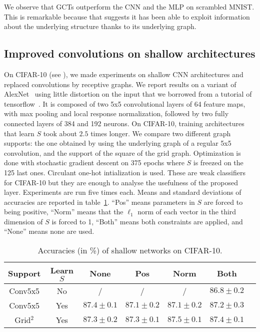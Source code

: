 We observe that GCTs outperform the CNN and the MLP on scrambled MNIST. This is remarkable because that suggests it has been able to exploit information about the underlying structure thanks to its underlying graph.

\subsection{Improved convolutions on shallow architectures}

On CIFAR-10 (see ), we made experiments on shallow CNN architectures and replaced convolutions by receptive graphs. We report results on a variant of AlexNet~\citep{krizhevsky2012imagenet} using little distortion on the input that we borrowed from a tutorial of tensorflow~\citep{tensorflow2015-whitepaper}.
It is composed of two 5x5 convolutional layers of 64 feature maps, with max pooling and local response normalization, followed by two fully connected layers of 384 and 192 neurons.
On CIFAR-10, training architectures that learn $S$ took about $2.5$ times longer.
We compare two different graph supports: the one obtained by using the underlying graph of a regular 5x5 convolution, and the support of the square of the grid graph. Optimization is done with stochastic gradient descent on 375 epochs where $S$ is freezed on the 125 last ones. Circulant one-hot intialization is used. These are weak classifiers for CIFAR-10 but they are enough to analyse the usefulness of the proposed layer.
Experiments are run five times each. Means and standard deviations of accuracies are reported in table~\ref{cifar}. ``Pos'' means parameters in $S$ are forced to being positive, ``Norm'' means that the $\ell_1$ norm of each vector in the third dimension of $S$ is forced to 1, ``Both'' means both constraints are applied, and ``None'' means none are used.

\begin{table}[H]
  \caption{Accuracies (in \%) of shallow networks on CIFAR-10.}
  \begin{center}
    \bgroup
    \def\arraystretch{1.5}%
    \begin{tabular}{|c|c|c|c|c|c|c|}
      \hline
      Support & Learn $S$ & None & Pos & Norm & Both\\
      \hline
      \hline
      Conv5x5 & No & / & / & / & $86.8 \pm 0.2$\\
      \hline
      Conv5x5 & Yes & $87.4 \pm 0.1$ & $87.1 \pm 0.2$ & $87.1 \pm 0.2$ & $87.2 \pm 0.3$\\
      \hline
      Grid$^2$ & Yes & $87.3 \pm 0.2$ & $87.3 \pm 0.1$ & $87.5 \pm 0.1$ & $87.4 \pm 0.1$\\
      \hline
    \end{tabular}
    \egroup
  \end{center}
  \label{cifar}
\end{table}

